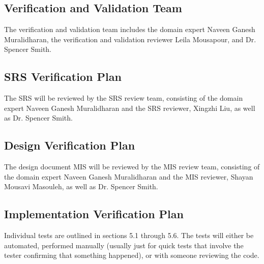 \documentclass[12pt, titlepage]{article}
\begin{document}
\subsection{Verification and Validation Team}

The verification and validation team includes the domain expert Naveen Ganesh Muralidharan, the verification and validation reviewer Leila Mousapour, and Dr. Spencer Smith.

\subsection{SRS Verification Plan}

The SRS will be reviewed by the SRS review team, consisting of the domain expert Naveen Ganesh Muralidharan and the SRS reviewer, Xingzhi Liu, as well as Dr. Spencer Smith.


\subsection{Design Verification Plan}

The design document MIS will be reviewed by the MIS review team, consisting of the domain expert Naveen Ganesh Muralidharan and the MIS reviewer, Shayan Mousavi Masouleh, as well as Dr. Spencer Smith.


\subsection{Implementation Verification Plan}

Individual tests are outlined in sections 5.1 through 5.6. The tests will either be automated, performed manually (usually just for quick tests that involve the tester confirming that something happened), or with someone reviewing the code.


\end{document}
